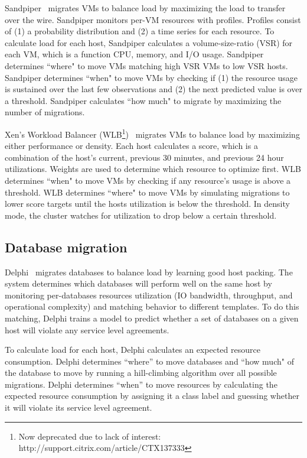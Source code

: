 Sandpiper~\cite{wood:nsdi07-sandpiper} migrates VMs to balance load by maximizing the load to transfer over the wire. Sandpiper monitors per-VM resources with profiles. Profiles consist of (1) a probability distribution and (2) a time series for each resource. To calculate load for each host, Sandpiper calculates a volume-size-ratio (VSR) for each VM, which is a function CPU, memory, and I/O usage. Sandpiper determines ``where" to move VMs matching high VSR VMs to low VSR hosts. Sandpiper determines ``when" to move VMs by checking if (1) the resource usage is sustained over the last few observations and (2) the next predicted value is over a threshold. Sandpiper calculates ``how much" to migrate by maximizing the number of migrations.

Xen's Workload Balancer (WLB\footnote{Now deprecated due to lack of interest: http://support.citrix.com/article/CTX137333})~\cite{xen-wlb} migrates VMs to balance load by maximizing either performance or density. Each host calculates a score, which is a combination of the host's current, previous 30 minutes, and previous 24 hour utilizations. Weights are used to determine which resource to optimize first. WLB determines ``when" to move VMs by checking if any resource's usage is above a threshold. WLB determines ``where" to move VMs by simulating migrations to lower score targets until the hosts utilization is below the threshold. In density mode, the cluster watches for utilization to drop below a certain threshold. 

\subsection{Database migration}
Delphi~\cite{elmore:sigmod2013-pythia} migrates databases to balance load by learning good host packing. The system determines which databases will perform well on the same host by monitoring per-databases resources utilization (IO bandwidth, throughput, and operational complexity) and matching behavior to different templates. To do this matching, Delphi trains a model to predict whether a set of databases on a given host will violate any service level agreements. 

To calculate load for each host, Delphi calculates an expected resource consumption. Delphi determines ``where'' to move databases and ``how much" of the database to move by running a hill-climbing algorithm over all possible migrations. Delphi determines ``when'' to move resources by calculating the expected resource consumption by assigning it a class label and guessing whether it will violate its service level agreement. 

